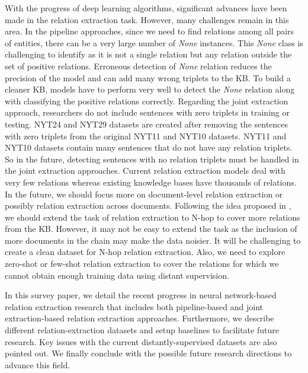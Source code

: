 With the progress of deep learning algorithms, significant advances have been made in the relation extraction task. However, many challenges remain in this area. In the pipeline approaches, since we need to find relations among all pairs of entities, there can be a very large number of {\em None} instances. This {\em None} class is challenging to identify as it is not a single relation but any relation outside the set of positive relations. Erroneous detection of {\em None} relation reduces the precision of the model and can add many wrong triplets to the KB. To build a cleaner KB, models have to perform very well to detect the {\em None} relation along with classifying the positive relations correctly. 
Regarding the joint extraction approach, researchers do not include sentences with zero triplets in training or testing. NYT24 and NYT29 datasets are created after removing the sentences with zero triplets from the original NYT11 and NYT10 datasets. NYT11 and NYT10 datasets contain many sentences that do not have any relation triplets. So in the future, detecting sentences with no relation triplets must be handled in the joint extraction approaches. 
Current relation extraction models deal with very few relations whereas existing knowledge bases have thousands of relations. In the future, we should focus more on document-level relation extraction or possibly relation extraction across documents. Following the idea proposed in , we should extend the task of relation extraction to N-hop to cover more relations from the KB. However, it may not be easy to extend the task as the inclusion of more documents in the chain may make the data noisier. It will be challenging to create a clean dataset for N-hop relation extraction. Also, we need to explore zero-shot or few-shot relation extraction to cover the relations for which we cannot obtain enough training data using distant supervision.

In this survey paper, we detail the recent progress in neural network-based relation extraction research that includes both pipeline-based and joint extraction-based relation extraction approaches. Furthermore, we describe different relation-extraction datasets and setup baselines to facilitate future research. Key issues with the current distantly-supervised datasets are also pointed out. We finally conclude with the possible future research directions to advance this field.


